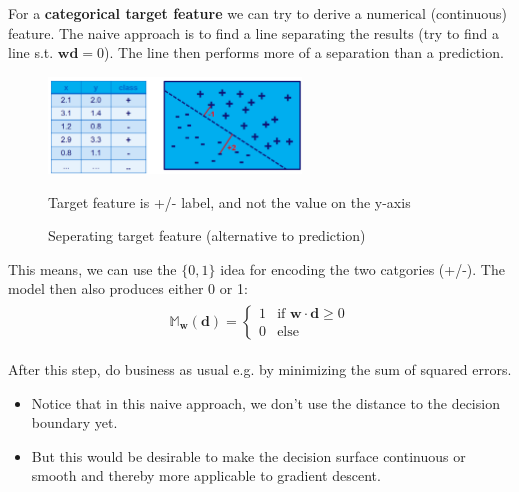 For a \textbf{categorical target feature} we can try to derive a numerical (continuous) feature. The naive approach is to find a line separating the results (try to find a line s.t. $\mathbf{w}\mathbf{d}=0$). The line then performs more of a separation than a prediction.

\begin{figure}[H]
  \centering
  \includegraphics[width=0.6\textwidth]{assets/regression/cf__target_line.png}

  Target feature is +/- label, and not the value on the y-axis
  \caption{Seperating target feature (alternative to prediction)}
  \label{fig:4_cat_target_line}
\end{figure}

This means, we can use the $\{0, 1\}$ idea for encoding the two catgories (+/-). The model then also produces either 0 or 1:
\begin{align*}\begin{aligned}
  \mathbb{M}_\mathbf{w}(\mathbf{d})=\left\{ \begin{array}{ll}1&\text{if }\mathbf{w}\cdot\mathbf{d}\geq0\\ 0 &\text{else}\end{array} \right.
\end{aligned}\end{align*}

After this step, do business as usual e.g. by minimizing the sum of squared errors.
\begin{itemize}
  \item Notice that in this naive approach, we don't use the distance to the decision boundary yet.
  \item But this would be desirable to make the decision surface continuous or smooth and thereby more applicable to gradient descent.
\end{itemize}